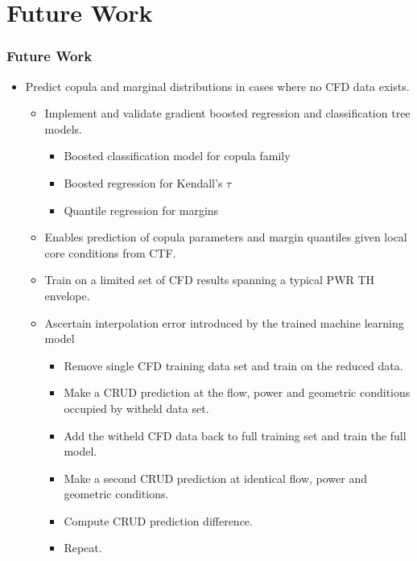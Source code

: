 \documentclass[t, pdftex]{beamer}
\begin{document}
\section{Future Work}
\begin{frame}[shrink=10]
\frametitle{Future Work}
\begin{itemize}
\item Predict copula and marginal distributions in cases where no CFD data exists.
\begin{itemize}
	\item Implement and validate gradient boosted regression and classification tree models.
	\begin{itemize}
		\item Boosted classification model for copula family
		\item Boosted regression for Kendall's $\tau$
		\item Quantile regression for margins
	\end{itemize}
	\item Enables prediction of copula parameters and margin quantiles given local core conditions from CTF.
	\item Train on a limited set of CFD results spanning a typical PWR TH envelope.
	\item Ascertain interpolation error introduced by the trained machine learning model
	\begin{itemize}
		\item Remove single CFD training data set and train on the reduced data.
		\item Make a CRUD prediction at the flow, power and geometric conditions occupied by witheld data set.
		\item Add the witheld CFD data back to full training set and train the full model.
		\item Make a second CRUD prediction at identical flow, power and geometric conditions.
		\item Compute CRUD prediction difference.
		\item Repeat.
	\end{itemize}
\end{itemize}
\end{itemize}
\end{frame}
\end{document}
